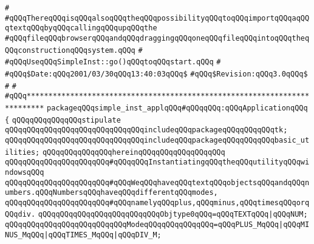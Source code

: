 \verb|#|\newline
\verb|#qQQqThereqQQqisqQQqalsoqQQqtheqQQqpossibilityqQQqtoqQQqimportqQQqaqQQqtextqQQqbyqQQqcallingqQQqupqQQqthe|\newline
\verb|#qQQqfileqQQqbrowserqQQqandqQQqdraggingqQQqoneqQQqfileqQQqintoqQQqtheqQQqconstructionqQQqsystem.qQQq|\newline
\verb|#|\newline
\verb|#qQQqUseqQQqSimpleInst::go()qQQqtoqQQqstart.qQQq|\newline
\verb|#|\newline
\verb|#qQQq$Date:qQQq2001/03/30qQQq13:40:03qQQq$|\newline
\verb|#qQQq$Revision:qQQq3.0qQQq$|\newline
\verb|#|\newline
\verb|#|\newline
\verb|#qQQq**************************************************************************|\newline
\newline
\newline
\newline
\verb|packageqQQqsimple_inst_applqQQq#qQQqqQQq:qQQqApplicationqQQq|\newline
\newline
\verb|{|\newline
\verb|qQQqqQQqqQQqqQQqstipulate|\newline
\verb|qQQqqQQqqQQqqQQqqQQqqQQqqQQqqQQqincludeqQQqpackageqQQqqQQqqQQqtk;|\newline
\verb|qQQqqQQqqQQqqQQqqQQqqQQqqQQqqQQqincludeqQQqpackageqQQqqQQqqQQqbasic_utilities;|\newline
\verb|qQQqqQQqqQQqqQQqhereinqQQqqQQqqQQqqQQqqQQq|\newline
\newline
\verb|qQQqqQQqqQQqqQQqqQQqqQQq#qQQqqQQqInstantiatingqQQqtheqQQqutilityqQQqwindowsqQQq|\newline
\newline
\verb|qQQqqQQqqQQqqQQqqQQqqQQq#qQQqWeqQQqhaveqQQqtextqQQqobjectsqQQqandqQQqnumbers.qQQqNumbersqQQqhaveqQQqdifferentqQQqmodes,|\newline
\verb|qQQqqQQqqQQqqQQqqQQqqQQq#qQQqnamelyqQQqplus,qQQqminus,qQQqtimesqQQqorqQQqdiv.|\newline
\newline
\verb|qQQqqQQqqQQqqQQqqQQqqQQqqQQqObjtype0qQQq=qQQqTEXTqQQq|\verb#|qQQqNUM;#\newline
\newline
\verb|qQQqqQQqqQQqqQQqqQQqqQQqqQQqModeqQQqqQQqqQQqqQQq=qQQqPLUS_MqQQq|\verb#|qQQqMINUS_MqQQq|qQQqTIMES_MqQQq|qQQqDIV_M;#\newline
